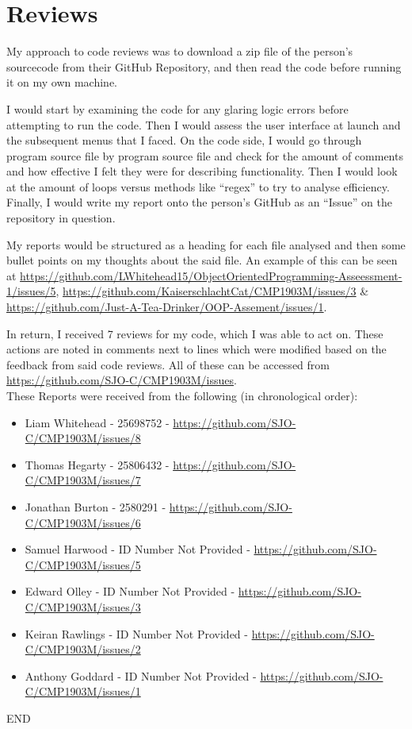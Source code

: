 \documentclass[11pt]{article} %
\begin{document}
\section{Reviews}
My approach to code reviews was to download a zip file of the person's sourcecode from their GitHub Repository, and then read the code before running it on my own machine.\par
I would start by examining the code for any glaring logic errors before attempting to run the code. Then I would assess the user interface at launch and the subsequent menus that I faced. On the code side, I would go through program source file by program source file and check for the amount of comments and how effective I felt they were for describing functionality. Then I would look at the amount of loops versus methods like ``regex'' to try to analyse efficiency. Finally, I would write my report onto the person's GitHub as an ``Issue'' on the repository in question.\par
My reports would be structured as a heading for each file analysed and then some bullet points on my thoughts about the said file. An example of this can be seen at \url{https://github.com/LWhitehead15/ObjectOrientedProgramming-Asseessment-1/issues/5}, \url{https://github.com/KaiserschlachtCat/CMP1903M/issues/3} \& \url{https://github.com/Just-A-Tea-Drinker/OOP-Assement/issues/1}.\par
In return, I received 7 reviews for my code, which I was able to act on. These actions are noted in comments next to lines which were modified based on the feedback from said code reviews. All of these can be accessed from \url{https://github.com/SJO-C/CMP1903M/issues}.\\
These Reports were received from the following (in chronological order):
\begin{itemize}
\item{Liam Whitehead -  25698752 - \url{https://github.com/SJO-C/CMP1903M/issues/8}}
\item{Thomas Hegarty - 25806432 -  \url{https://github.com/SJO-C/CMP1903M/issues/7}}
\item{Jonathan Burton - 2580291 -  \url{https://github.com/SJO-C/CMP1903M/issues/6}}
\item{Samuel Harwood - ID Number Not Provided -  \url{https://github.com/SJO-C/CMP1903M/issues/5}}
\item{Edward Olley - ID Number Not Provided -  \url{https://github.com/SJO-C/CMP1903M/issues/3}}
\item{Keiran Rawlings - ID Number Not Provided -  \url{https://github.com/SJO-C/CMP1903M/issues/2}}
\item{Anthony Goddard - ID Number Not Provided -  \url{https://github.com/SJO-C/CMP1903M/issues/1}}
\end{itemize}
\vfill
\begin{centering}\huge{END}\end{centering}
\end{document}

